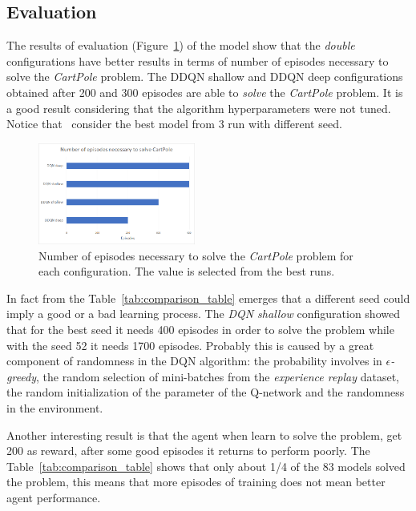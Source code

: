 \subsection{Evaluation}

The results of evaluation (Figure~\ref{fig:comparison}) of the model show that the \textit{double} configurations have better results in terms of number of episodes necessary to solve the \textit{CartPole} problem. The DDQN shallow and DDQN deep configurations obtained after 200 and 300 episodes are able to \textit{solve} the \textit{CartPole} problem. It is a good result considering that the algorithm hyperparameters were not tuned. Notice that \auth~consider the best model from 3 run with different seed. 

\begin{figure}[t]
	\centering
	\includegraphics[width=0.46\textwidth]{res/Comparison}
	\caption{Number of episodes necessary to solve the \textit{CartPole} problem for each configuration. The value is selected from the best runs.}
	\label{fig:comparison}
\end{figure}

In fact from the Table~\ref{tab:comparison_table} emerges that a different seed could imply a good or a bad learning process. The \textit{DQN shallow} configuration showed that for the best seed it needs 400 episodes in order to solve the problem while with the seed 52 it needs 1700 episodes. Probably this is caused by a great component of randomness in the DQN algorithm: the probability involves in \textit{$\epsilon$-greedy}, the random selection of mini-batches from the \textit{experience replay} dataset, the random initialization of the parameter of the Q-network and the randomness in the environment.

Another interesting result is that the agent when learn to solve the problem, get 200 as reward, after some good episodes it returns to perform poorly. The Table~\ref{tab:comparison_table} shows that only about 1/4 of the 83 models solved the problem, this means that more episodes of training does not mean better agent performance.

